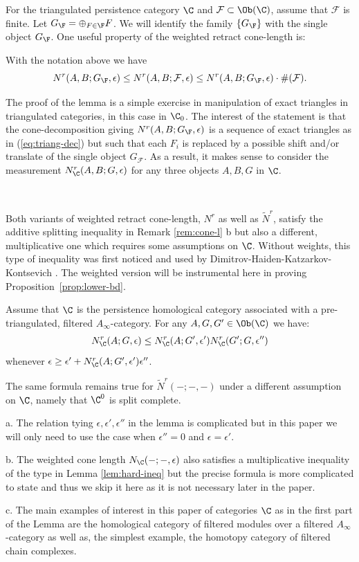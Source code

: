 For the triangulated persistence category $\C$ and
$\mathcal{F}\subset \Ob (\C)$, assume that $\mathcal{F}$ is finite.
Let $G_{\F}=\oplus_{F\in\F}F$.  We will identify the family
$\{G_{\F}\}$ with the single object $G_{\F}$. One useful property of
the weighted retract cone-length is: 
\begin{lem}\label{lem:comp-sw}
  With the notation above we have
  $$N^{r}(A, B;G_{\F}, \epsilon) \leq N^{r}(A, B;\mathcal{F},
  \epsilon) \leq N^{r}(A, B;G_{\F}, \epsilon) \cdot
  \#(\mathcal{F}).$$
\end{lem}


The proof of the lemma is a simple exercise in manipulation of exact
triangles in triangulated categories, in this case in $\C_{0}$.  The
interest of the statement is that the cone-decomposition giving
$N^{r}(A,B; G_{\F},\epsilon)$ is a sequence of exact triangles as
in (\ref{eq:triang-dec}) but such that each $F_{i}$ is replaced by a
possible shift and/or translate of the single object
$G_{\mathcal{F}}$. As a result, it makes sense to consider the
measurement $N_{\C}^{r}(A,B; G,\epsilon)$ for any three objects
$A,B,G$ in $\C$.

\

Both variants of weighted retract cone-length, $N^{r}$ as well as
$\tilde{N}^{r}$, satisfy the additive splitting inequality in Remark
\ref{rem:cone-l} b but also a different, multiplicative one which
requires some assumptions on $\C$. Without weights, this type of
inequality was first noticed and used by
Dimitrov-Haiden-Katzarkov-Kontsevich \cite{DHKK:dyn_cat}. The
  weighted version will be instrumental here in proving
Proposition~\ref{prop:lower-bd}.

\begin{lem}\label{lem:hard-ineq} Assume that $\C$ is the persistence
 homological category associated with a
  pre-triangulated, filtered $A_{\infty}$-category. For any
  $A,G,G'\in \Ob (\C)$ we have:
  $$ N^{r}_{\C}(A;G,\epsilon)\leq N^{r}_{\C}(A;G',\epsilon')
  N^{r}_{\C}(G'; G,\epsilon'')$$ whenever
  $\epsilon \geq \epsilon ' + N^{r}_{\C}(A;G',\epsilon')
  \epsilon''$.

  The same formula remains true for $\tilde{N}^{r}(-;-,-)$ under a
  different assumption on $\C$, namely that $\C^{0}$ is split
  complete.
\end{lem}

\begin{rem} a. The relation tying
  $\epsilon, \epsilon', \epsilon''$ in the lemma is
  complicated but in this paper we will only need to use the case when
  $\epsilon''=0$ and $\epsilon=\epsilon'$.

  b. The weighted cone length $N_{\C}(-;-,\epsilon)$ also satisfies
  a multiplicative inequality of the type in Lemma \ref{lem:hard-ineq}
  but the precise formula is more complicated to state and thus we
  skip it here as it is not necessary later in the paper.

  c. The main examples of interest in this paper of categories $\C$ as
  in the first part of the Lemma are the homological category
  of filtered modules over a filtered $A_{\infty}$-category as well
  as, the simplest example, the homotopy category of filtered chain
  complexes.
\end{rem}

